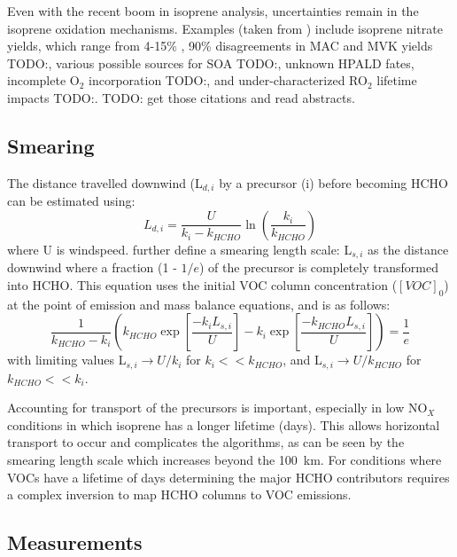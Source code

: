     Even with the recent boom in isoprene analysis, uncertainties remain in the isoprene oxidation mechanisms.
    Examples (taken from \citet{Nguyen2014}) include isoprene nitrate yields, which range from 4-15\% \citep{Paulot2009a}, 90\% disagreements in MAC and MVK yields TODO:\citep{Liu2013}, various possible sources for SOA TODO:\citep{Chan2010, Surratt2010, Lin2013}, unknown HPALD fates, incomplete O$_2$ incorporation TODO:\citep{Peeters2009,Crounse2013}, and under-characterized RO$_2$ lifetime impacts TODO:\citep{Wolfe2012}. TODO: get those citations and read abstracts.
      
  \subsection{Smearing}
  \label{ch_LitRev:sec:smearing}
    The distance travelled downwind (L$_{d,i}$ by a precursor (i) before becoming HCHO can be estimated using:
    \begin{equation*}
      L_{d,i} = \frac{U}{k_i - k_{HCHO}} \ln{ \left( \frac{k_i}{k_{HCHO}} \right) }
    \end{equation*}
    where U is windspeed.
    \citet{Palmer2003} further define a smearing length scale: L$_{s,i}$ as the distance downwind where a fraction (1 - $1/e$) of the precursor is completely transformed into HCHO.
    This equation uses the initial VOC column concentration ($[VOC]_0$) at the point of emission and mass balance equations, and is as follows:
    \begin{equation}
      \frac{1}{k_{HCHO}-k_i} \left( k_{HCHO} \exp{ \left[ \frac{-k_i L_{s,i}}{U} \right]} -k_i \exp{ \left[ \frac{-k_{HCHO} L_{s,i}}{U} \right]} \right) = \frac{1}{e} 
    \end{equation}
    with limiting values L$_{s,i} \rightarrow U/k_i$ for $k_i << k_{HCHO}$, and L$_{s,i} \rightarrow U/k_{HCHO}$ for $k_{HCHO} << k_i$.  
    
    Accounting for transport of the precursors is important, especially in low NO$_X$ conditions in which isoprene has a longer lifetime (days).
    This allows horizontal transport to occur and complicates the algorithms, as can be seen by the smearing length scale which increases beyond the 100~km.
    For conditions where VOCs have a lifetime of days determining the major HCHO contributors requires a complex inversion to map HCHO columns to VOC emissions.
    
  \subsection{Measurements}
  
